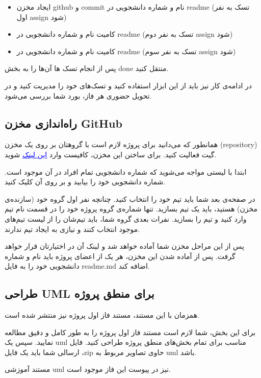 \documentclass[]{article}
\begin{document}
\begin{itemize}

\item
ایجاد مخزن github و commit نام و شماره دانشجویی در readme (تسک به نفر اول assign شود)

\item
کامیت نام و شماره دانشجویی در readme (تسک به نفر دوم assign شود)

\item
کامیت نام و شماره دانشجویی در readme (تسک به نفر سوم assign شود)

\end{itemize}

پس از انجام تسک ها آن‌ها را به بخش done منتقل کنید.

در ادامه‌ی کار نیز باید از این ابزار استفاده کنید ‌و تسک‌های خود را مدیریت کنید و در تحویل حضوری هر فاز، بورد شما بررسی می‌شود.


\newpage
\subsection*{{\titr راه‌اندازی مخزن GitHub}}
\label{subsec:github}

همانطور که می‌دانید برای پروژه لازم است با گروهتان بر روی یک مخزن (repository) گیت فعالیت کنید. برای ساختن این مخزن، کافیست وارد
 \href{https://classroom.github.com/g/5Uo3x-M4}{\textcolor{blue}{\underline{این لینک}}} 
 شوید.

ابتدا با لیستی مواجه می‌شوید که شماره دانشجویی تمام افراد در آن موجود است. شماره دانشجویی خود را بیابید و بر روی آن کلیک کنید.

در صفحه‌ی بعد شما باید تیم خود را انتخاب کنید. چنانچه نفر اول گروه خود (سازنده‌ی مخزن) هستید، باید یک تیم بسازید. تنها شماره‌ی گروه پروژه خود را در قسمت نام تیم وارد کنید و تیم را بسازید. نفرات بعدی گروه شما، باید تیم‌شان را از لیست تیم‌های موجود انتخاب کنند و نیازی به ایجاد تیم ندارند.

پس از این مراحل مخزن شما آماده خواهد شد و لینک آن در اختیارتان قرار خواهد گرفت. پس از آماده شدن این مخزن، هر یک از اعضای پروژه باید نام و شماره دانشجویی خود را به فایل readme.md اضافه کند.

\newpage
\subsection*{{\titr طراحی UML برای منطق پروژه}}
\label{subsec:uml}

همزمان با این مستند، مستند فاز اول پروژه نیز منتشر شده است.

برای این بخش، شما لازم است مستند فاز اول پروژه را به طور کامل و دقیق مطالعه نمایید. سپس یک uml مناسب برای تمام بخش‌های منطق پروژه طراحی کنید. فایل ارسالی شما باید یک فایل ،zip حاوی تصاویر مربوط به uml باشد.

مستند آموزشی uml نیز در پیوست این فاز موجود است.
\end{document}
